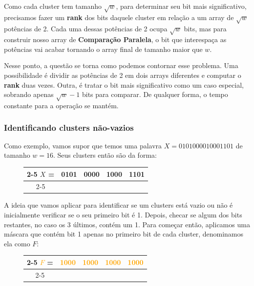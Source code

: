 Como cada cluster tem tamanho $\sqrt w$, para determinar seu bit mais
significativo, precisamos fazer um \textbf{rank} dos bits daquele cluster em
relação a um array de $\sqrt w$ potências de 2. Cada uma dessas potências de 2
ocupa $\sqrt{w}$ bits, mas para construir nosso array de \textbf{Comparação
Paralela}, o bit que interespaça as potências vai acabar tornando o array final
de tamanho maior que $w$. 

Nesse ponto, a questão se torna como podemos contornar esse problema. Uma
possibilidade é dividir as potências de 2 em dois arrays diferentes e computar o
\textbf{rank} duas vezes. Outra, é tratar o bit mais significativo como um caso
especial, sobrando apenas $\sqrt{w}-1$ bits para comparar. De qualquer forma, o
tempo constante para a operação se mantém.

\subsubsection{Identificando clusters não-vazios}

Como exemplo, vamos supor que temos uma palavra $X=0101000010001101$ de tamanho
$w=16$. Seus clusters então são da forma:

\begin{figure}[h]
 \bf \Large\centering
 \begin{tabular}{c|cccc|}
\cline{2-5}
\textcolor{PineGreen}{$X$} = &
\textcolor{PineGreen}{0101} &
\textcolor{PineGreen}{0000} &
\textcolor{PineGreen}{1000} &
\textcolor{PineGreen}{1101} \\
\cline{2-5}
  \end{tabular}
\end{figure}

A ideia que vamos aplicar para identificar se um clusters está vazio ou não é
inicialmente verificar se o seu primeiro bit é 1. Depois, checar se algum dos
bits restantes, no caso os 3 últimos, contém um 1. Para começar então, aplicamos
uma máscara que contém bit 1 apenas no primeiro bit de cada cluster, denominamos
ela como $F$:

\begin{figure}[h]
 \bf \Large\centering
 \begin{tabular}{c|cccc|}
\cline{2-5}
\textcolor{orange}{$F$} = &
\textcolor{orange}{1000} &
\textcolor{orange}{1000} &
\textcolor{orange}{1000} &
\textcolor{orange}{1000} \\
\cline{2-5}
  \end{tabular}
\end{figure}

